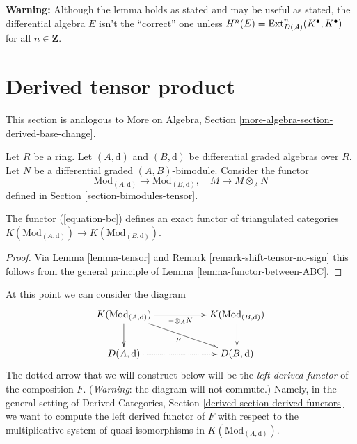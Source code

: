 \noindent
{\bf Warning:} Although the lemma holds as stated and may be useful
as stated, the differential algebra $E$ isn't the ``correct'' one unless
$H^n(E) = \mathop{\mathrm{Ext}}\nolimits^n_{D(\mathcal{A})}(K^\bullet, K^\bullet)$
for all $n \in \mathbf{Z}$.





\section{Derived tensor product}
\label{section-base-change}

\noindent
This section is analogous to More on Algebra, Section
\ref{more-algebra-section-derived-base-change}.

\medskip\noindent
Let $R$ be a ring. Let $(A, \text{d})$ and $(B, \text{d})$ be
differential graded algebras over $R$. Let $N$ be a
differential graded $(A, B)$-bimodule. Consider the functor
\begin{equation}
\label{equation-bc}
\text{Mod}_{(A, \text{d})}
\longrightarrow
\text{Mod}_{(B, \text{d})},\quad
M \longmapsto M \otimes_A N
\end{equation}
defined in Section \ref{section-bimodules-tensor}.

\begin{lemma}
\label{lemma-bc-homotopy}
The functor (\ref{equation-bc}) defines an exact functor
of triangulated categories
$K(\text{Mod}_{(A, \text{d})}) \to K(\text{Mod}_{(B, \text{d})})$.
\end{lemma}

\begin{proof}
Via Lemma \ref{lemma-tensor} and
Remark \ref{remark-shift-tensor-no-sign}
this follows from the general principle of
Lemma \ref{lemma-functor-between-ABC}.
\end{proof}

\noindent
At this point we can consider the diagram
$$
\xymatrix{
K(\text{Mod}_{(A, \text{d})}) \ar[d] \ar[rr]_{- \otimes_A N} \ar[rrd]_F & &
K(\text{Mod}_{(B, \text{d})}) \ar[d] \\
D(A, \text{d}) \ar@{..>}[rr] & &
D(B, \text{d})
}
$$
The dotted arrow that we will construct below will be the
{\it left derived functor} of the composition $F$.
({\it Warning}: the diagram will not commute.)
Namely, in the general setting of
Derived Categories, Section \ref{derived-section-derived-functors}
we want to compute the
left derived functor of $F$ with respect to the multiplicative system of
quasi-isomorphisms in $K(\text{Mod}_{(A, \text{d})})$.

